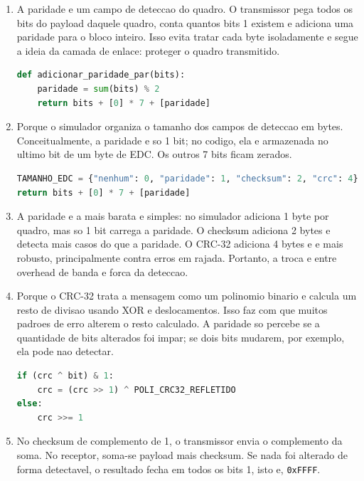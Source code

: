 \documentclass[12pt,a4paper]{article}
\begin{document}
\begin{enumerate}
  \item A paridade e um campo de deteccao do quadro. O transmissor pega todos os bits do payload daquele quadro, conta quantos bits 1 existem e adiciona uma paridade para o bloco inteiro. Isso evita tratar cada byte isoladamente e segue a ideia da camada de enlace: proteger o quadro transmitido.

  \begin{lstlisting}[language=Python]
def adicionar_paridade_par(bits):
    paridade = sum(bits) % 2
    return bits + [0] * 7 + [paridade]
  \end{lstlisting}

  \item Porque o simulador organiza o tamanho dos campos de deteccao em bytes. Conceitualmente, a paridade e so 1 bit; no codigo, ela e armazenada no ultimo bit de um byte de EDC. Os outros 7 bits ficam zerados.

  \begin{lstlisting}[language=Python]
TAMANHO_EDC = {"nenhum": 0, "paridade": 1, "checksum": 2, "crc": 4}
return bits + [0] * 7 + [paridade]
  \end{lstlisting}

  \item A paridade e a mais barata e simples: no simulador adiciona 1 byte por quadro, mas so 1 bit carrega a paridade. O checksum adiciona 2 bytes e detecta mais casos do que a paridade. O CRC-32 adiciona 4 bytes e e mais robusto, principalmente contra erros em rajada. Portanto, a troca e entre overhead de banda e forca da deteccao.

  \item Porque o CRC-32 trata a mensagem como um polinomio binario e calcula um resto de divisao usando XOR e deslocamentos. Isso faz com que muitos padroes de erro alterem o resto calculado. A paridade so percebe se a quantidade de bits alterados foi impar; se dois bits mudarem, por exemplo, ela pode nao detectar.

  \begin{lstlisting}[language=Python]
if (crc ^ bit) & 1:
    crc = (crc >> 1) ^ POLI_CRC32_REFLETIDO
else:
    crc >>= 1
  \end{lstlisting}

  \item No checksum de complemento de 1, o transmissor envia o complemento da soma. No receptor, soma-se payload mais checksum. Se nada foi alterado de forma detectavel, o resultado fecha em todos os bits 1, isto e, \texttt{0xFFFF}.


\end{enumerate}
\end{document}
